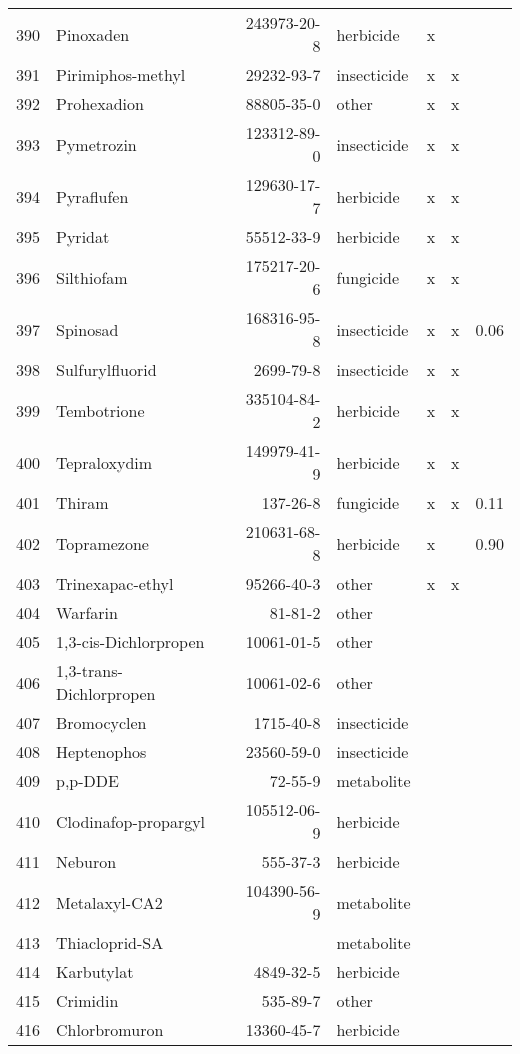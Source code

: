 \begin{longtable}{lp{3cm}rlp{0.5cm}p{0.5cm}p{1cm}}
  390 & Pinoxaden & 243973-20-8 & herbicide & x &  &  \\ 
  391 & Pirimiphos-methyl & 29232-93-7 & insecticide & x & x &  \\ 
  392 & Prohexadion & 88805-35-0 & other & x & x &  \\ 
  393 & Pymetrozin & 123312-89-0 & insecticide & x & x &  \\ 
  394 & Pyraflufen & 129630-17-7 & herbicide & x & x &  \\ 
  395 & Pyridat & 55512-33-9 & herbicide & x & x &  \\ 
  396 & Silthiofam & 175217-20-6 & fungicide & x & x &  \\ 
  397 & Spinosad & 168316-95-8 & insecticide & x & x & 0.06 \\ 
  398 & Sulfurylfluorid & 2699-79-8 & insecticide & x & x &  \\ 
  399 & Tembotrione & 335104-84-2 & herbicide & x & x &  \\ 
  400 & Tepraloxydim & 149979-41-9 & herbicide & x & x &  \\ 
  401 & Thiram & 137-26-8 & fungicide & x & x & 0.11 \\ 
  402 & Topramezone & 210631-68-8 & herbicide & x &  & 0.90 \\ 
  403 & Trinexapac-ethyl & 95266-40-3 & other & x & x &  \\ 
  404 & Warfarin & 81-81-2 & other &  &  &  \\ 
  405 & 1,3-cis-Dichlorpropen & 10061-01-5 & other &  &  &  \\ 
  406 & 1,3-trans-Dichlorpropen & 10061-02-6 & other &  &  &  \\ 
  407 & Bromocyclen & 1715-40-8 & insecticide &  &  &  \\ 
  408 & Heptenophos & 23560-59-0 & insecticide &  &  &  \\ 
  409 & p,p-DDE & 72-55-9 & metabolite &  &  &  \\ 
  410 & Clodinafop-propargyl & 105512-06-9 & herbicide &  &  &  \\ 
  411 & Neburon & 555-37-3 & herbicide &  &  &  \\ 
  412 & Metalaxyl-CA2 & 104390-56-9 & metabolite &  &  &  \\ 
  413 & Thiacloprid-SA &  & metabolite &  &  &  \\ 
  414 & Karbutylat & 4849-32-5 & herbicide &  &  &  \\ 
  415 & Crimidin & 535-89-7 & other &  &  &  \\ 
  416 & Chlorbromuron & 13360-45-7 & herbicide &  &  &  \\ 

\end{longtable}
